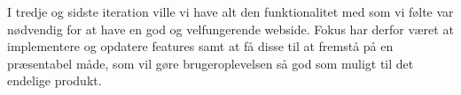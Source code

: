 I tredje og sidste iteration ville vi have alt den funktionalitet med som vi følte var nødvendig for at have en god og velfungerende webside. Fokus har derfor været at implementere og opdatere features samt at få disse til at fremstå på en præsentabel måde, som vil gøre brugeroplevelsen så god som muligt til det endelige produkt.
















